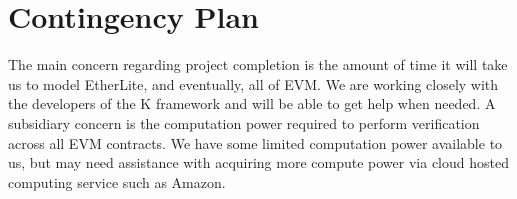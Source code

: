 \section{Contingency Plan}

The main concern regarding project completion is the amount of time it will take us to model EtherLite, and eventually, all of EVM. We are working closely with the developers of the K framework and will be able to get help when needed. A subsidiary concern is the computation power required to perform verification across all EVM contracts.
We have some limited computation power available to us, but may need assistance with acquiring more compute power via cloud hosted computing service such as Amazon. 


